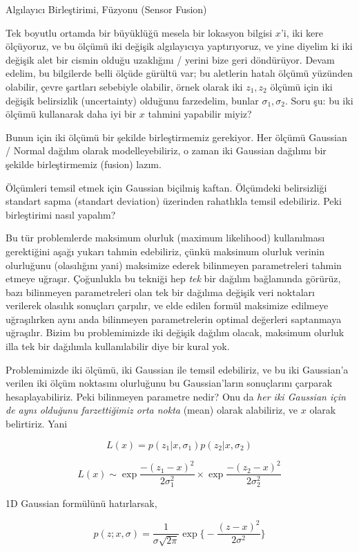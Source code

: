 \documentclass[12pt,fleqn]{article}\usepackage{../../common}
\begin{document}
Algılayıcı Birleştirimi, Füzyonu (Sensor Fusion)

Tek boyutlu ortamda bir büyüklüğü mesela bir lokasyon bilgisi $x$'i, iki
kere ölçüyoruz, ve bu ölçümü iki değişik algılayıcıya yaptırıyoruz, ve yine
diyelim ki iki değişik alet bir cismin olduğu uzaklığını / yerini bize geri
döndürüyor. Devam edelim, bu bilgilerde belli ölçüde gürültü var; bu
aletlerin hatalı ölçümü yüzünden olabilir, çevre şartları sebebiyle
olabilir, örnek olarak iki $z_1,z_2$ ölçümü için iki değişik belirsizlik
(uncertainty) olduğunu farzedelim, bunlar $\sigma_1,\sigma_2$. Soru şu: bu
iki ölçümü kullanarak daha iyi bir $x$ tahmini yapabilir miyiz?

Bunun için iki ölçümü bir şekilde birleştirmemiz gerekiyor. Her ölçümü
Gaussian / Normal dağılım olarak modelleyebiliriz, o zaman iki Gaussian
dağılımı bir şekilde birleştirmemiz (fusion) lazım. 

Ölçümleri temsil etmek için Gaussian biçilmiş kaftan. Ölçümdeki
belirsizliği standart sapma (standart deviation) üzerinden rahatlıkla
temsil edebiliriz. Peki birleştirimi nasıl yapalım?

Bu tür problemlerde maksimum olurluk (maximum likelihood) kullanılması
gerektiğini aşağı yukarı tahmin edebiliriz, çünkü maksimum olurluk verinin
olurluğunu (olasılığını yani) maksimize ederek bilinmeyen parametreleri
tahmin etmeye uğraşır. Çoğunlukla bu tekniği hep {\em tek} bir dağılım
bağlamında görürüz, bazı bilinmeyen parametreleri olan tek bir dağılıma
değişik veri noktaları verilerek olasılık sonuçları çarpılır, ve elde
edilen formül maksimize edilmeye uğraşılırken aynı anda bilinmeyen
parametrelerin optimal değerleri saptanmaya uğraşılır. Bizim bu
problemimizde iki değişik dağılım olacak, maksimum olurluk illa tek bir
dağılımla kullanılabilir diye bir kural yok.

Problemimizde iki ölçümü, iki Gaussian ile temsil edebiliriz, ve bu iki
Gaussian'a verilen iki ölçüm noktasını olurluğunu bu Gaussian'ların
sonuçlarını çarparak hesaplayabiliriz. Peki bilinmeyen parametre nedir? Onu
da {\em her iki Gaussian için de aynı olduğunu farzettiğimiz orta nokta}
(mean) olarak alabiliriz, ve $x$ olarak belirtiriz. Yani

$$ L(x) = p(z_1|x,\sigma_1) p(z_2|x,\sigma_2) $$

$$ L(x) \sim \exp{\frac{-(z_1-x)^2}{2\sigma_1^2} } 
\times \exp \frac{-(z_2-x)^2}{2\sigma_2^2} $$

1D Gaussian formülünü hatırlarsak, 

$$ p(z;x,\sigma) = \frac{1}{\sigma\sqrt{2\pi}} 
\exp \bigg\{ - \frac{(z-x)^2}{2\sigma^2}  \bigg\}
 $$
\end{document}
